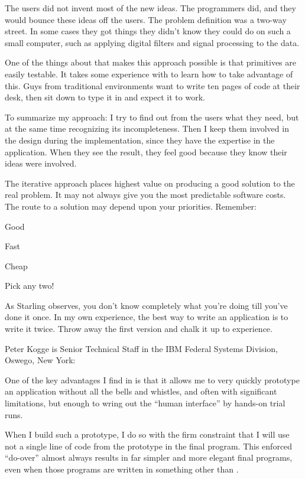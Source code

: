 \begin{interview}
\begin{tfquot}
The users did not invent most of the new ideas. The programmers did,
and they would bounce these ideas off the users. The problem
definition was a two-way street. In some cases they got things they
didn't know they could do on such a small computer, such as applying
digital filters and signal processing to the data.

One of the things about \Forth{} that makes this approach possible is
that primitives are easily testable. It takes some experience with
\Forth{} to learn how to take advantage of this. Guys from traditional
environments want to write ten pages of code at their desk, then sit
down to type it in and expect it to work.

To summarize my approach: I try to find out from the users what they
need, but at the same time recognizing its incompleteness. Then I keep
them involved in the design during the implementation, since they have
the expertise in the application.  When they see the result, they feel
good because they know their ideas were involved.

The iterative approach places highest value on producing a good
solution to the real problem. It may not always give you the most
predictable software costs. The route to a solution may depend upon
your priorities. Remember:
\begin{list}{}{}
\item Good
\item Fast
\item Cheap
\end{list}
Pick any two!
\end{tfquot}
\end{interview}

\noindent As Starling observes, you don't know completely what you're
doing till you've done it once. In my own experience, the best way to
write an application is to write it twice. Throw away the first
version and chalk it up to experience.

\begin{interview}
\noindent Peter Kogge is Senior Technical Staff in the IBM Federal
Systems Division, Oswego, New York:

\begin{tfquot}
One of the key advantages I find in \Forth{} is that it allows me to
very quickly prototype an application without all the bells and
whistles, and often with significant limitations, but enough to wring
out the ``human interface'' by hands-on trial runs.

When I build such a prototype, I do so with the firm constraint that I
will use not a single line of code from the prototype in the final
program. This enforced ``do-over'' almost always results in far
simpler and more elegant final programs, even when those programs are
written in something other than \Forth{}.
\end{tfquot}
\end{interview}

